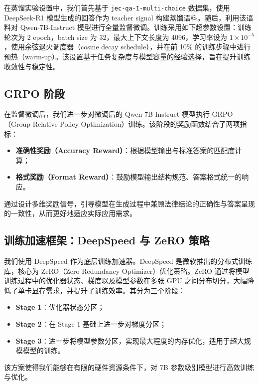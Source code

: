 \documentclass{pkuthesis}
\begin{document}
在蒸馏实验设置中，我们首先基于 \texttt{jec-qa-1-multi-choice} 数据集，使用 DeepSeek-R1 模型生成的回答作为 teacher signal 构建蒸馏语料。随后，利用该语料对 Qwen-7B-Instruct 模型进行全量监督微调。训练采用如下超参数设置：训练轮次为 2 epoch，batch size 为 32，最大上下文长度为 4096，学习率设为 $1 \times 10^{-5}$，使用余弦退火调度器（cosine decay schedule），并在前 10\% 的训练步骤中进行预热（warm-up）。该设置基于任务复杂度与模型容量的经验选择，旨在提升训练收敛性与稳定性。

\subsection{GRPO 阶段}

在监督微调后，我们进一步对微调后的 Qwen-7B-Instruct 模型执行 GRPO（Group Relative Policy Optimization）训练。该阶段的奖励函数结合了两项指标：

\begin{itemize}
\item \textbf{准确性奖励（Accuracy Reward）}：根据模型输出与标准答案的匹配度计算；
\item \textbf{格式奖励（Format Reward）}：鼓励模型输出结构规范、答案格式统一的响应。
\end{itemize}

通过设计多维奖励信号，引导模型在生成过程中兼顾法律结论的正确性与答案呈现的一致性，从而更好地适应实际应用需求。

\subsection{训练加速框架：DeepSpeed 与 ZeRO 策略}

我们使用 DeepSpeed 作为底层训练加速器。DeepSpeed 是微软推出的分布式训练库，核心为 ZeRO（Zero Redundancy Optimizer）优化策略。ZeRO 通过将模型训练过程中的优化器状态、梯度以及模型参数在多张 GPU 之间分布切分，大幅降低了单卡显存需求，并提升了训练效率。其分为三个阶段：

\begin{itemize}
\item \textbf{Stage 1}：优化器状态分区；
\item \textbf{Stage 2}：在 Stage 1 基础上进一步对梯度分区；
\item \textbf{Stage 3}：进一步将模型参数分区，实现最大程度的内存优化，适用于超大规模模型的训练。
\end{itemize}

该方案使得我们能够在有限的硬件资源条件下，对 7B 参数级别模型进行高效训练与优化。
\end{document}
